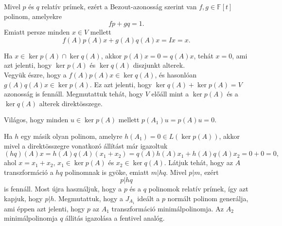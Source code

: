 \documentclass[9pt, a4paper, showtrims]{memoir}
\makeatletter
\renewenvironment{proof}[1][\proofname]
    {\par\pushQED{\qed}%
    \normalfont \topsep6\p@\@plus6\p@\relax
    \trivlist
    \item[\hskip\labelsep
        \itshape
    #1\@addpunct{:}]\ignorespaces}
    {\popQED\endtrivlist\@endpefalse}
\theoremstyle{plain}
\theoremstyle{remark}
\theoremstyle{definition}
\makeatother
\begin{document}
    \begin{proof}
        Mivel $p$ és $q$ relatív prímek, ezért a Bezout-azonosság szerint van $f,g\in\mathbb{F}\left[ t \right]$ polinom, amelyekre
        \[
            fp+gq=1.
        \]
        Emiatt persze minden $x\in V$ mellett 
        \[
            f\left( A \right)p\left( A \right)x
            +
            g\left( A \right)q\left( A \right)x=Ix=x.\tag{\dag}
        \]

        Ha $x\in\ker p\left( A \right)\cap\ker q\left( A \right)$,
        akkor 
        $p\left( A \right)x=0=q\left( A \right)x$, tehát $x=0$, ami azt jelenti, hogy
        $\ker p\left( A \right)$ és 
        $\ker q\left( A \right)$ diszjunkt alterek.
        \\
        Vegyük észre, hogy a
        $f\left( A \right)p\left( A \right)x\in\ker q\left( A \right)$,
        és hasonlóan 
        $g\left( A \right)q\left( A \right)x\in\ker p\left( A \right)$.
        Ez azt jelenti, hogy $\ker q\left( A \right)+\ker p\left( A \right)=V$ azonosság is fennáll.
        Megmutattuk tehát, hogy $V$ előáll mint a $\ker p\left( A \right)$ és a 
        $\ker q\left( A \right)$ alterek direktösszege.

        Világos, hogy minden $u\in\ker p\left( A \right)$ mellett
        $p\left( A_1 \right)u
        =
        p\left( A \right)u=0$.

        Ha $h$ egy másik olyan polinom, amelyre $h\left( A_1 \right)=0\in L\left( \ker p\left( A \right) \right)$,
        akkor mivel a direktösszegre vonatkozó állítást már igazoltuk
        \[
            (hq)\left( A \right)x=
            h\left( A \right)q\left( A \right)\left( x_1+x_2 \right)
            =
            q\left( A \right)h\left( A \right)x_1
            +
            h\left( A \right)q\left( A \right)x_2
            =0+0
            =0,
        \]
        ahol $x=x_1+x_2$, $x_1\in \ker p\left( A \right)$ és 
        $x_2\in\ker q\left( A \right)$.
        Látjuk tehát, hogy az $A$ transzformáció a $hq$ polinomnak is gyöke,
        emiatt $m|hq$.
        Mivel $p|m$, ezért 
        \[p|hq\] is fennáll.
        Most újra használjuk, hogy a $p$ és a $q$ polinomok relatív prímek,
        így azt kapjuk, hogy $p|h.$
        Megmutattuk, hogy a $J_{A_1}$ ideált a $p$ normált polinom generálja,
        ami éppen azt jelenti, hogy $p$ az $A_1$ transzformáció minimálpolinomja.
        Az $A_2$ minimálpolinomja $q$ állitás igazolása a fentivel analóg.
    \end{proof}
\end{document}
